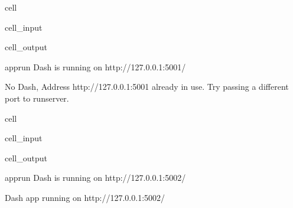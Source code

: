 \documentclass[letterpaper,10pt,english]{jupyterBook}
\begin{document}
\begin{sphinxuseclass}{cell}\begin{sphinxVerbatimInput}

\begin{sphinxuseclass}{cell_input}
\begin{sphinxVerbatim}[commandchars=\\\{\}]
\end{sphinxVerbatim}

\end{sphinxuseclass}\end{sphinxVerbatimInput}
\begin{sphinxVerbatimOutput}

\begin{sphinxuseclass}{cell_output}
\begin{sphinxVerbatim}[commandchars=\\\{\}]
apprun
Dash is running on http://127.0.0.1:5001/
\end{sphinxVerbatim}

\begin{sphinxVerbatim}[commandchars=\\\{\}]
No Dash, Address \PYGZsq{}http://127.0.0.1:5001\PYGZsq{} already in use.
    Try passing a different port to run\PYGZus{}server.
\end{sphinxVerbatim}

\end{sphinxuseclass}\end{sphinxVerbatimOutput}

\end{sphinxuseclass}
\begin{sphinxuseclass}{cell}\begin{sphinxVerbatimInput}

\begin{sphinxuseclass}{cell_input}
\begin{sphinxVerbatim}[commandchars=\\\{\}]
\end{sphinxVerbatim}

\end{sphinxuseclass}\end{sphinxVerbatimInput}
\begin{sphinxVerbatimOutput}

\begin{sphinxuseclass}{cell_output}
\begin{sphinxVerbatim}[commandchars=\\\{\}]
apprun
Dash is running on http://127.0.0.1:5002/
\end{sphinxVerbatim}

\begin{sphinxVerbatim}[commandchars=\\\{\}]
Dash app running on http://127.0.0.1:5002/
\end{sphinxVerbatim}

\end{sphinxuseclass}\end{sphinxVerbatimOutput}

\end{sphinxuseclass}
\end{document}
